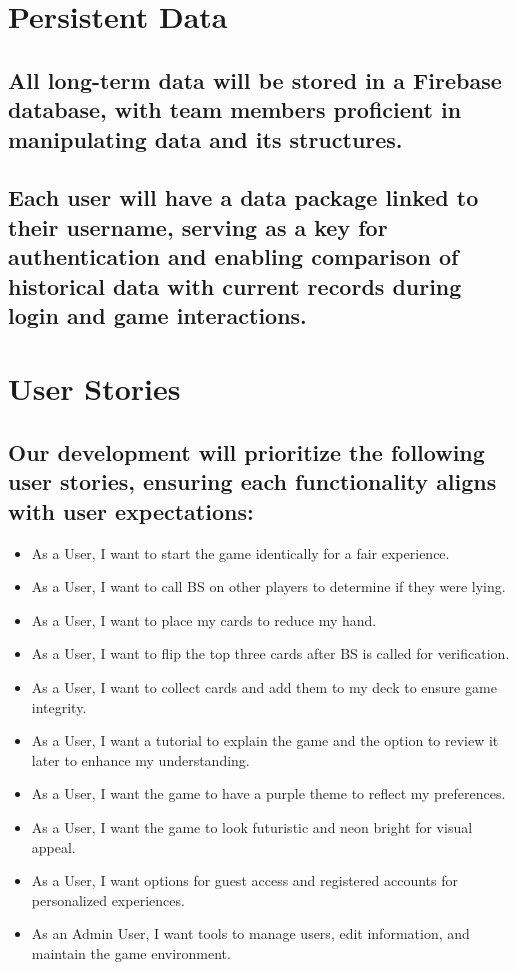 \documentclass{article}
\begin{document}
\section{Persistent Data}
\subsection{All long-term data will be stored in a Firebase database, with team members proficient in manipulating data and its structures.}
\subsection{Each user will have a data package linked to their username, serving as a key for authentication and enabling comparison of historical data with current records during login and game interactions.}

\section{User Stories}
\subsection{Our development will prioritize the following user stories, ensuring each functionality aligns with user expectations:}

\begin{itemize}
    \item As a User, I want to start the game identically for a fair experience.
    \item As a User, I want to call BS on other players to determine if they were lying.
    \item As a User, I want to place my cards to reduce my hand.
    \item As a User, I want to flip the top three cards after BS is called for verification.
    \item As a User, I want to collect cards and add them to my deck to ensure game integrity.
    \item As a User, I want a tutorial to explain the game and the option to review it later to enhance my understanding.
    \item As a User, I want the game to have a purple theme to reflect my preferences.
    \item As a User, I want the game to look futuristic and neon bright for visual appeal.
    \item As a User, I want options for guest access and registered accounts for personalized experiences.
    \item As an Admin User, I want tools to manage users, edit information, and maintain the game environment.
\end{itemize}
\end{document}
